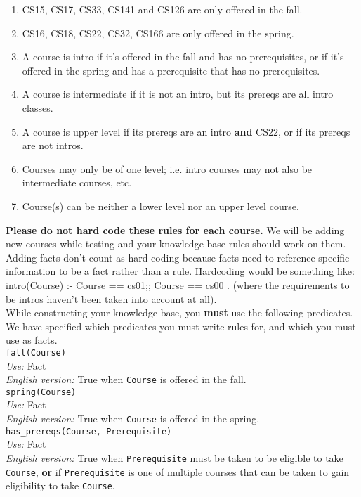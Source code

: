 \documentclass{article}
\begin{document}
\begin{enumerate}
    \item CS15, CS17, CS33, CS141 and CS126 are only offered in the fall.
    \item CS16, CS18, CS22, CS32, CS166 are only offered in the spring.
    \item A course is intro if it's offered in the fall and has no prerequisites, or if it's offered in the spring and has a prerequisite that has no prerequisites. 
    \item A course is intermediate if it is not an intro, but its prereqs are all intro classes.
    \item A course is upper level if its prereqs are an intro \textbf{and} CS22, or if its prereqs are not intros. 
    \item Courses may only be of one level; i.e. intro courses may not also be intermediate courses, etc.
    \item Course(s) can be neither a lower level nor an upper level course.
\end{enumerate}

\textbf{Please do not hard code these rules for each course.} We will be adding new courses while testing and your knowledge base rules should work on them. Adding facts don't  count as hard coding  because facts need to reference specific information to be a fact rather than a rule. Hardcoding would be something like: intro(Course) :- Course == cs01;; Course == cs00 . (where the requirements to be intros haven't been taken into account at all).\\

While constructing your knowledge base, you \textbf{must} use the following predicates. We have specified which predicates you must write rules for, and which you must use as facts. \\

\verb|fall(Course)|\\
\textit{Use:} Fact\\
\textit{English version:} True when \verb|Course| is offered in the fall.\\

\verb|spring(Course)|\\
\textit{Use:} Fact\\
\textit{English version:} True when \verb|Course| is offered in the spring.\\

\verb|has_prereqs(Course, Prerequisite)|\\
\textit{Use:} Fact\\
\textit{English version:} True when \verb|Prerequisite| must be taken to be eligible to take \verb|Course|, \textbf{or} if \verb|Prerequisite| is one of multiple courses that can be taken to gain eligibility to take \verb|Course|. \\
\end{document}
